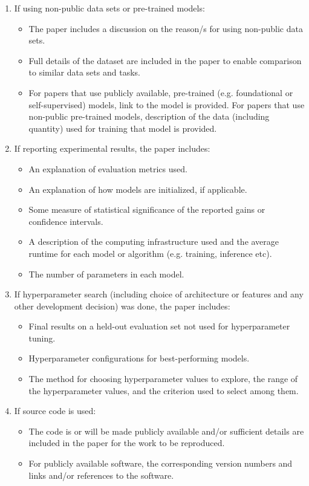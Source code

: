 \documentclass[cameraready]{Interspeech}
\begin{document}
\begin{enumerate}
\item If using non-public data sets or pre-trained models:
\begin{itemize}
\item The paper includes a discussion on the reason/s for using non-public data sets.
\item Full details of the dataset are included in the paper to enable comparison to similar data sets and tasks.
\item For papers that use publicly available, pre-trained (e.g. foundational or self-supervised) models, link to the model is provided. For papers that use non-public pre-trained models, description of the data (including quantity) used for training that model is provided.
\end{itemize}


\item If reporting experimental results, the paper includes:
\begin{itemize}
\item An explanation of evaluation metrics used.
\item An explanation of how models are initialized, if applicable.
\item Some measure of statistical significance of the reported gains or confidence intervals.
\item A description of the computing infrastructure used and the average runtime for each model or algorithm (e.g. training, inference etc).
\item The number of parameters in each model.
\end{itemize}

\item If hyperparameter search (including choice of architecture or features and any other development decision) was done, the paper includes:
\begin{itemize}
\item Final results on a held-out evaluation set not used for hyperparameter tuning.
\item Hyperparameter configurations for best-performing models.
\item The method for choosing hyperparameter values to explore, the range of the hyperparameter values, and the criterion used to select among them.
\end{itemize}

\item If source code is used:
\begin{itemize}
\item The code is or will be made publicly available and/or sufficient details are included in the paper for the work to be reproduced.
\item For publicly available software, the corresponding version numbers and links and/or references to the software.
\end{itemize}

\end{enumerate}
\end{document}
